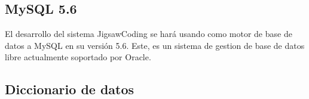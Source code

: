 \subsection{MySQL 5.6}
El desarrollo del sistema JigsawCoding se hará usando como motor de base de datos a MySQL en su versión 5.6. Este, es un sistema de gestion de base de datos libre actualmente soportado por Oracle. 
\subsection{Diccionario de datos}